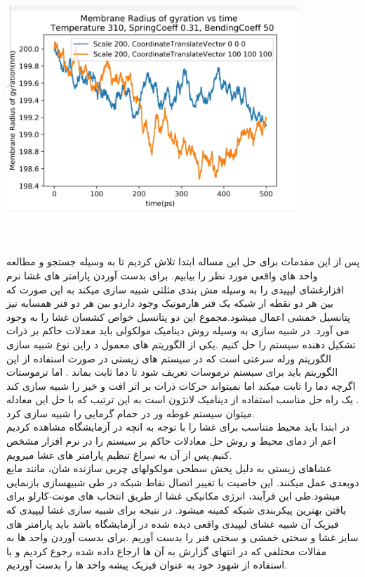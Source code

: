 \documentclass[12pt,onecolumn,a4paper]{report}
\begin{document}
{\begin{center}
\includegraphics[width=11cm, height=9cm]{20210215_142645.jpg}
\end{center}\\
پس از این مقدمات
برای حل این مساله ابتدا تلاش کردیم تا به وسیله جستجو و مطالعه واحد های واقعی مورد نظر را بیابیم. برای بدست آوردن پارامتر های غشا نرم افزارغشای لیپیدی را به وسیله مش بندی مثلثی شبیه سازی میکند به این صورت که بین هر دو نقطه از شبکه یک فنر هارمونیک وجود داردو بین هر دو فنر همسایه نیز پتانسیل خمشی اعمال میشود.مجموع این دو پتانسیل خواص کشسان غشا را به وجود می آورد.
در شبیه سازی به وسیله روش دینامیک مولکولی باید معدلات حاکم بر ذرات تشکیل دهنده سیستم را حل کنیم .یکی از الگوریتم های معمول د راین نوع شبیه سازی الگوریتم ورله سرعتی است که در سیستم های زیستی  در صورت استفاده از این الگوریتم باید برای سیستم ترموسات تعریف شود تا دما ثابت بماند . اما ترموستات اگرچه دما را ثابت میکند اما نمیتواند  حرکات ذرات بر اثر افت و خیز را شبیه سازی کند . یک راه حل مناسب استفاده از دینامیک لانژون است به این ترتیب که با حل این معادله میتوان سیستم غوطه ور در حمام گرمایی را شبیه سازی کرد.\\
در ابتدا باید محیط متناسب برای غشا را با توجه به انچه در آزمایشگاه مشاهده کردیم اعم از دمای محیط و روش حل معادلات حاکم بر سیستم را  در نرم افزار مشخص کنیم.پس از آن به سراغ تنظیم پارامتر های غشا میرویم.\\
غشاهای زیستی به دلیل پخش سطحی مولکولهای
چربی سازنده شان، مانند مایع دوبعدی عمل میکنند. این خاصیت با تغییر اتصال نقاط شبکه
در طی شبیهسازی بازنمایی میشود.طی این فرآیند، انرژی مکانیکی غشا از طریق انتخاب های
مونت-کارلو برای یافتن بهترین پیکربندی شبکه کمینه میشود.
در نتیجه برای شبیه سازی غشا لیپیدی که فیزیک آن شبیه غشای لیپیدی واقعی دیده شده در آزمایشگاه باشد باید پارامتر های سایز غشا  و سختی خمشی و سختی فنر را بدست آوریم .برای بدست آوردن واحد ها به مقالات مختلفی که در انتهای گزارش به آن ها ارجاع داده شده رجوع کردیم و با استفاده از شهود خود به عنوان فیزیک پیشه واحد ها را بدست آوردیم.\\
}
\end{document}
